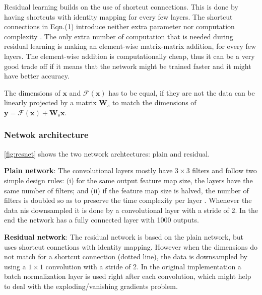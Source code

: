 Residual learning builds on the use of shortcut connections. 
This is done by having shortcuts with identity mapping for every few layers.
The shortcut connections in Eqn.(1) introduce neither extra parameter nor computation complexity \cite{resnet}.
The only extra number of computation that is needed during residual learning is making an element-wise matrix-matrix addition, for every few layers.
The element-wise addition is computationally cheap, thus it can be a very good trade off if it means that the network might be trained faster and it might have better accuracy.

The dimensions of $\bm{x}$ and $\mathcal{F}(\bm{x})$ has to be equal, if they are not the data can be linearly projected by a matrix $\bm{W}_s$ to match the dimensions of $\bm{y} = \mathcal{F}(\bm{x}) + \bm{W}_s\bm{x}$.

\subsubsection{Netwok architecture}%

\autoref{fig:resnet} shows the two network archtectures: plain and residual.

\textbf{Plain network}: The convolutional layers mostly have $3 \times 3$ filters and follow two simple design rules:
(i) for the same output
feature map size, the layers have the same number of filters; and
(ii) if the feature map size is halved, the number of filters is doubled so as to preserve the time complexity per layer
\cite{resnet}.
Whenever the data nis downsampled it is done by a convolutional layer with a stride of 2.
In the end the network has a fully connected layer with 1000 outputs.

\textbf{Residual network}: 
The residual network is based on the plain network, but uses shortcut connctions with identity mapping. However when the dimensions do not match for a shortcut connection (dotted line), the data is downsampled by using a $1 \times 1$ convolution with a stride of 2.
In the original implementation a batch normalization layer is used right after each convolution, which might help to deal with the exploding/vanishing gradients problem.

